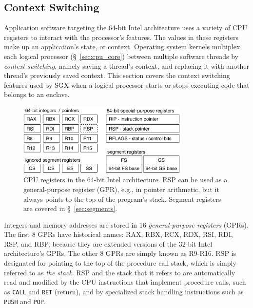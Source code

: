 \subsection{Context Switching}
\label{sec:registers}

Application software targeting the 64-bit Intel architecture uses a variety of
CPU registers to interact with the processor's features. The values in these
registers make up an application's state, or context. Operating system kernels
multiplex each logical processor (\S~\ref{sec:cpu_core}) between multiple
software threads by \textit{context switching}, namely saving a thread's
context, and replacing it with another thread's previously saved context. This
section covers the context switching features used by SGX when a logical
processor starts or stops executing code that belongs to an enclave.


\begin{figure}[hbt]
  \centering
  \includegraphics[width=85mm]{figures/cpu_registers.pdf}
  \caption{
    CPU registers in the 64-bit Intel architecture. RSP can be used as a
    general-purpose register (GPR), e.g., in pointer arithmetic, but it always
    points to the top of the program's stack. Segment registers are covered in
    \S~\ref{sec:segments}.
  }
  \label{fig:cpu_registers}
\end{figure}

Integers and memory addresses are stored in 16 \textit{general-purpose
registers} (GPRs). The first 8 GPRs have historical names: RAX, RBX, RCX,
RDX, RSI, RDI, RSP, and RBP, because they are extended versions of the 32-bit
Intel architecture's GPRs. The other 8 GPRs are simply known as R9-R16. RSP is
designated for pointing to the top of the procedure call stack, which is simply
referred to as \textit{the stack}. RSP and the stack that it refers to are
automatically read and modified by the CPU instructions that implement
procedure calls, such as \texttt{CALL} and \texttt{RET} (return), and by
specialized stack handling instructions such as \texttt{PUSH} and \texttt{POP}.


